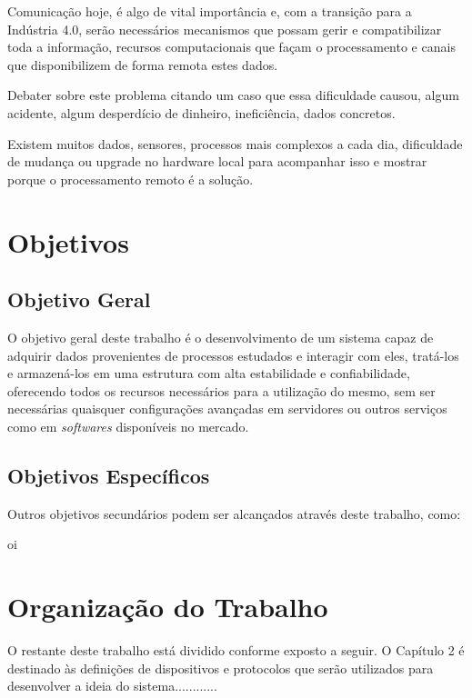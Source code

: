 Comunicação hoje, é algo de vital importância e, com a transição para a Indústria 4.0, serão necessários mecanismos que possam gerir e compatibilizar toda a informação, recursos computacionais que façam o processamento e canais que disponibilizem de forma remota estes dados.

Debater sobre este problema citando um caso que essa dificuldade causou, algum acidente, algum desperdício de dinheiro, ineficiência, dados concretos.

Existem muitos dados, sensores, processos mais complexos a cada dia, dificuldade de mudança ou upgrade no hardware local para acompanhar isso e mostrar porque o processamento remoto é a solução.

\section{Objetivos}
\label{sec:objetivos}

\subsection{Objetivo Geral}
\label{sec:objetivo-geral}

O objetivo geral deste trabalho é o desenvolvimento de um sistema capaz de adquirir dados provenientes de processos estudados e interagir com eles, tratá-los e armazená-los em uma estrutura com alta estabilidade e confiabilidade, oferecendo todos os recursos necessários para a utilização do mesmo, sem ser necessárias quaisquer configurações avançadas em servidores ou outros serviços como em  \textit{softwares} disponíveis no mercado.

\subsection{Objetivos Específicos}
\label{sec:objetivos-especificos}

Outros objetivos secundários podem ser alcançados através deste trabalho, como:

\begin{alineascomponto}
    \item oi
\end{alineascomponto}

\section{Organização do Trabalho}
\label{sec:organizacao-trabalho}

O restante deste trabalho está dividido conforme exposto a seguir. O Capítulo 2 é destinado às definições de dispositivos e protocolos que serão utilizados para desenvolver a ideia do sistema............